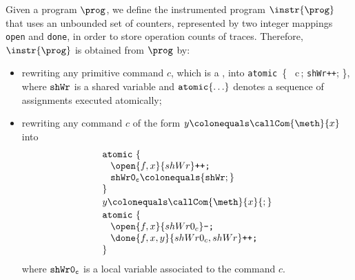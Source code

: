 Given a program $\prog$, we define the instrumented program $\instr{\prog}$ that uses an unbounded set of counters, represented by two integer mappings {\tt open} and {\tt done}, in order to store operation counts of traces. %
Therefore, $\instr{\prog}$ is obtained from $\prog$ by: 
\begin{itemize}
	\item rewriting any primitive command $c$, which is a {\shwrite}, into
	{\tt atomic}\ \{ \ c\,; \mbox{{\tt shWr++}}; \},
	where ${\tt shWr}$ is a shared variable and ${\tt atomic} \{\ldots\}$ denotes a sequence of assignments executed atomically;
	
	\item rewriting any command $c$ of the form $y \colonequals \callCom{\meth}{x}$ into %
	\[
	\begin{array}{l}
	{\tt atomic}\ \{ \\
	\hspace{3mm}\open{f,x}{shWr}\mbox{\tt ++;}\\
	\hspace{3mm}{\tt shWr0_c}\colonequals {\tt shWr;}\\
	\}\\[.5mm]
	y \colonequals \callCom{\meth}{x}{\tt ;} \\[.5mm]
	{\tt atomic}\ \{\\ 
	\hspace{3mm}\open{f,x}{shWr0_c}\mbox{\tt --;} \\
	\hspace{3mm} \done{f,x,y}{shWr0_c,shWr}\mbox{\tt ++;}\\
	\}\\
	\end{array}
	\]
	where ${\tt shWr0_c}$ is a local variable associated to the command $c$.
	
\end{itemize}

